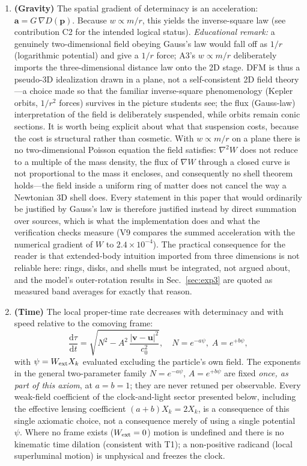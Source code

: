 \documentclass[aps,reprint,amsmath,amssymb,nofootinbib,superscriptaddress,floatfix]{revtex4-2}
\newcommand{\ud}{\mathrm{d}}
\newcommand{\vect}[1]{\bm{#1}}
\newcommand{\Kt}{X_k}
\begin{document}
\begin{enumerate}
\item[A6.]{\bf (Gravity)} The spatial gradient of determinacy is an
acceleration: $\vect{a} = G\,\nabla D(\vect{p})$.
Because $w \propto m/r$, this yields the inverse-square law
(see contribution C2 for the intended logical status).
\emph{Educational remark:} a genuinely two-dimensional field obeying
Gauss's law would fall off as $1/r$ (logarithmic potential) and give a
$1/r$ force; A3's $w \propto m/r$ deliberately imports the
three-dimensional distance law onto the 2D stage.
DFM is thus a pseudo-3D idealization drawn in a plane, not a
self-consistent 2D field theory---a choice made so that the familiar
inverse-square phenomenology (Kepler orbits, $1/r^2$ forces) survives
in the picture students see; the flux (Gauss-law) interpretation of
the field is deliberately suspended, while orbits remain conic
sections.
It is worth being explicit about what that suspension costs, because
the cost is structural rather than cosmetic.
With $w \propto m/r$ on a plane there is no two-dimensional Poisson
equation the field satisfies: $\nabla^2 W$ does not reduce to a
multiple of the mass density, the flux of $\nabla W$ through a closed
curve is not proportional to the mass it encloses, and consequently
no shell theorem holds---the field inside a uniform ring of matter
does not cancel the way a Newtonian 3D shell does.
Every statement in this paper that would ordinarily be justified by
Gauss's law is therefore justified instead by direct summation over
sources, which is what the implementation does and what the
verification checks measure (V9 compares the summed acceleration with
the numerical gradient of $W$ to $2.4\times10^{-4}$).
The practical consequence for the reader is that extended-body
intuition imported from three dimensions is not reliable here: rings,
disks, and shells must be integrated, not argued about, and the
model's outer-rotation results in Sec.~\ref{sec:exp3} are quoted as
measured band averages for exactly that reason.

\item[A7$'$.]{\bf (Time)} The local proper-time rate decreases with
determinacy and with speed relative to the comoving frame:
\begin{equation}
\frac{\ud\tau}{\ud t}
 = \sqrt{N^2 - A^2\,\frac{|\vect{v}-\vect{u}|^2}{c_0^2}},
\quad
N = e^{-a\psi},\; A = e^{+b\psi},
\label{eq:A7}
\end{equation}
with $\psi = W_{\rm ext}\Kt$ evaluated excluding the particle's own
field.
The exponents in the general two-parameter family
$N = e^{-a\psi}$, $A = e^{+b\psi}$ are fixed \emph{once, as part of
this axiom}, at $a = b = 1$; they are never retuned per observable.
Every weak-field coefficient of the clock-and-light sector presented
below, including the effective lensing coefficient
$(a+b)\Kt = 2\Kt$, is a consequence of this single axiomatic choice,
not a consequence merely of using a single potential $\psi$.
Where no frame exists ($W_{\rm ext}=0$) motion is undefined and there
is no kinematic time dilation (consistent with T1); a non-positive
radicand (local superluminal motion) is unphysical and freezes the
clock.


\end{enumerate}
\end{document}

